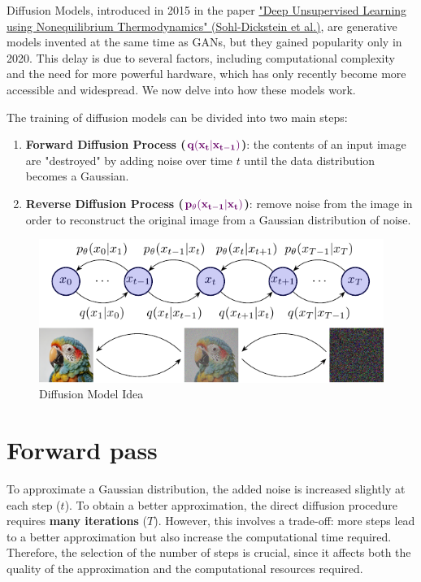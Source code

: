 Diffusion Models, introduced in 2015 in the paper \href{https://arxiv.org/pdf/1503.03585}{"Deep Unsupervised Learning using Nonequilibrium Thermodynamics" (Sohl-Dickstein et al.)}, are generative models invented at the same time as GANs, but they gained popularity only in 2020. This delay is due to several factors, including computational complexity and the need for more powerful hardware, which has only recently become more accessible and widespread. We now delve into how these models work.

The training of diffusion models can be divided into two main steps:

\begin{enumerate}
    \item \textbf{Forward Diffusion Process ($\mathbf{\textcolor{mypurple}{q(x_{t}|x_{t-1})}}$)}: the contents of an input image are "destroyed" by adding noise over time $t$ until the data distribution becomes a Gaussian.
    \item \textbf{Reverse Diffusion Process ($\mathbf{\textcolor{mypurple}{p_{\theta}(x_{t-1}|x_t)}}$)}: remove noise from the image in order to reconstruct the original image from a Gaussian distribution of noise.
\end{enumerate}

\begin{figure}[!htbp]
    \centering
    \includegraphics[width=\linewidth]{tikz/chapter10 - Diffusion Models Idea.pdf}
    \caption{Diffusion Model Idea}
\end{figure}


\section{Forward pass}

To approximate a Gaussian distribution, the added noise is increased slightly at each step ($t$). To obtain a better approximation, the direct diffusion procedure requires \textbf{many iterations} ($T$). However, this involves a trade-off: more steps lead to a better approximation but also increase the computational time required. Therefore, the selection of the number of steps is crucial, since it affects both the quality of the approximation and the computational resources required.

